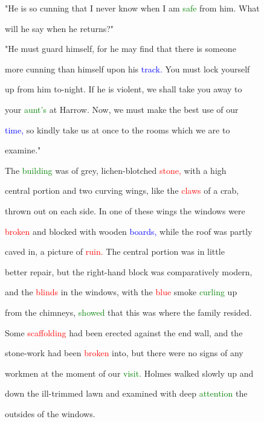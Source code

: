  "He is so \textcolor{BurntOrange}{cunning} that I never know when I am \textcolor{green}{safe} from him. What

 will he say when he returns?"



 "He must \textcolor{BurntOrange}{guard} himself, for he may find that there is someone

 more \textcolor{BurntOrange}{cunning} than himself upon his \textcolor{blue}{track.} You must lock yourself

 up from him to-night. If he is \textcolor{BurntOrange}{violent,} we shall take you away to

 your \textcolor{green}{aunt's} at Harrow. Now, we must make the best use of our

 \textcolor{blue}{time,} so kindly take us at once to the rooms which we are to

 examine."



 The \textcolor{green}{building} was of grey, lichen-blotched \textcolor{red}{stone,} with a high

 central portion and two curving wings, like the \textcolor{red}{claws} of a crab,

 thrown out on each side. In one of these wings the windows were

 \textcolor{red}{broken} and blocked with wooden \textcolor{blue}{boards,} while the roof was partly

 caved in, a picture of \textcolor{red}{ruin.} The central portion was in little

 better repair, but the right-hand block was comparatively modern,

 and the \textcolor{red}{blinds} in the windows, with the \textcolor{red}{blue} smoke \textcolor{green}{curling} up

 from the chimneys, \textcolor{green}{showed} that this was where the family resided.

 Some \textcolor{red}{scaffolding} had been erected against the end wall, and the

 stone-work had been \textcolor{red}{broken} into, but there were no signs of any

 workmen at the moment of our \textcolor{green}{visit.} Holmes walked slowly up and

 down the ill-trimmed lawn and examined with deep \textcolor{green}{attention} the

 outsides of the windows.



